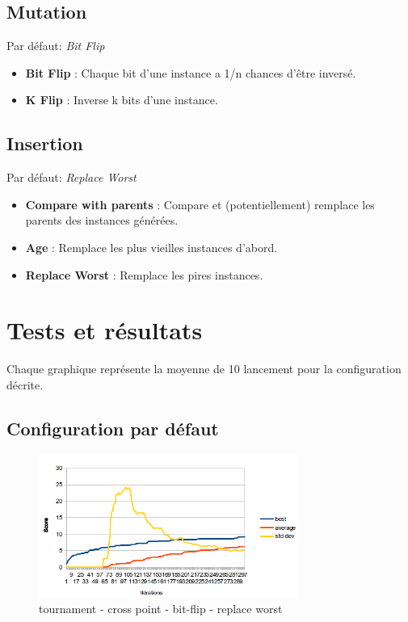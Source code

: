 \documentclass[a4paper,10pt]{report}
\begin{document}
\subsection{Mutation}
Par défaut: \textit{Bit Flip}
\begin{itemize}
   \item \textbf{Bit Flip} : Chaque bit d'une instance a 1/n chances d'être inversé.
   \item \textbf{K Flip} : Inverse k bits d'une instance.
\end{itemize}


\subsection{Insertion}
Par défaut: \textit{Replace Worst}
\begin{itemize}
  \item \textbf{Compare with parents} : Compare et (potentiellement) remplace les parents des instances générées.
  \item \textbf{Age} : Remplace les plus vieilles instances d'abord.
  \item \textbf{Replace Worst} : Remplace les pires instances.
\end{itemize}


\pagebreak
\section{Tests et résultats}
Chaque graphique représente la moyenne de 10 lancement pour la configuration décrite.

\subsection{Configuration par défaut}
\begin{figure}[h]
  \begin{center}
    \includegraphics[width=320px]{images/graph-default.png}
  \end{center}
  \caption{tournament - cross point - bit-flip - replace worst}
\end{figure}
\end{document}
